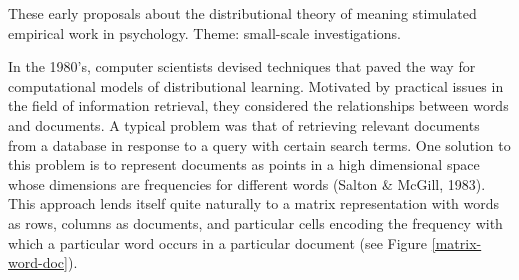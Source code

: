\documentclass[man,floatsintext]{apa6}
\begin{document}
These early proposals about the distributional theory of meaning
stimulated empirical work in psychology. Theme: small-scale
investigations.








In the 1980's, computer scientists devised techniques that paved the
way for computational models of distributional learning. Motivated by
practical issues in the field of information retrieval, they
considered the relationships between words and documents. A typical
problem was that of retrieving relevant documents from a database in
response to a query with certain search terms. One solution to this
problem is to represent documents as points in a high dimensional
space whose dimensions are frequencies for different words (Salton \&
McGill, 1983). This approach lends itself quite naturally to a matrix
representation with words as rows, columns as documents, and
particular cells encoding the frequency with which a particular word
occurs in a particular document (see Figure \ref{matrix-word-doc}).
\end{document}
